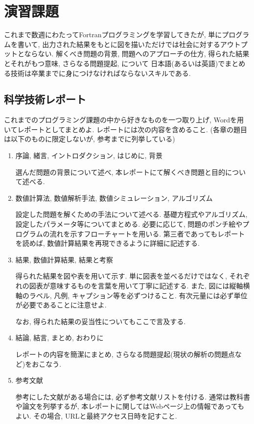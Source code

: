 \chapter{演習課題}
これまで数週にわたってFortranプログラミングを学習してきたが, 
単にプログラムを書いて, 出力された結果をもとに図を描いただけでは社会に対するアウトプットとならない. 
解くべき問題の背景, 問題へのアプローチの仕方, 得られた結果とそれがもつ意味, さらなる問題提起, について
日本語(あるいは英語)でまとめる技術は卒業までに身につけなければならないスキルである. 

\section{科学技術レポート}
これまでのプログラミング課題の中から好きなものを一つ取り上げ, Wordを用いてレポートとしてまとめよ. 
レポートには次の内容を含めること. (各章の題目は以下のものに限定しないが, 参考までに列挙している)

\begin{enumerate}
\item 序論, 緒言, イントロダクション, はじめに, 背景

選んだ問題の背景について述べ, 本レポートにて解くべき問題と目的について述べる. 

\item 数値計算法, 数値解析手法, 数値シミュレーション, アルゴリズム

設定した問題を解くための手法について述べる. 
基礎方程式やアルゴリズム, 設定したパラメータ等についてまとめる. 
必要に応じて, 問題のポンチ絵やプログラムの流れを示すフローチャートを用いる. 
第三者であってもレポートを読めば, 数値計算結果を再現できるように詳細に記述する. 


\item 結果, 数値計算結果, 結果と考察

得られた結果を図や表を用いて示す. 
単に図表を並べるだけではなく, それぞれの図表が意味するものを言葉を用いて丁寧に記述する. 
また, 図には縦軸横軸のラベル, 凡例, キャプション等を必ずつけること. 
有次元量には必ず単位が必要であることに注意せよ. 

なお, 得られた結果の妥当性についてもここで言及する. 

\item 結論, 結言, まとめ, おわりに

レポートの内容を簡潔にまとめ, さらなる問題提起(現状の解析の問題点など)をおこなう. 

\item 参考文献

参考にした文献がある場合には, 必ず参考文献リストを付ける. 
通常は教科書や論文を列挙するが, 
本レポートに関してはWebページ上の情報であってもよい. 
その場合, URLと最終アクセス日時を記すこと. 

\end{enumerate}

